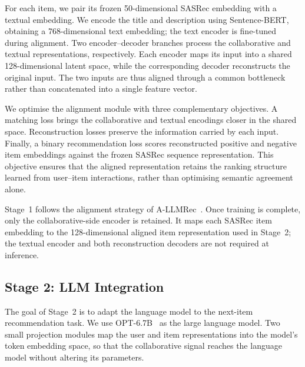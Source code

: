 \documentclass[runningheads]{llncs}
\begin{document}
For each item, we pair its frozen 50-dimensional SASRec embedding with a
textual embedding. We encode the title and description using Sentence-BERT,
obtaining a 768-dimensional text embedding; the text encoder is fine-tuned
during alignment. Two encoder--decoder branches process the collaborative and
textual representations, respectively. Each
encoder maps its input into a shared 128-dimensional latent space, while the
corresponding decoder reconstructs the original input. The two inputs are thus
aligned through a common bottleneck rather than concatenated into a single
feature vector.

We optimise the alignment module with three complementary objectives. A
matching loss brings the collaborative and textual encodings closer in the
shared space. Reconstruction losses preserve the information carried by each
input. Finally, a binary
recommendation loss scores reconstructed positive and negative item embeddings
against the frozen SASRec sequence representation. This objective ensures that
the aligned representation retains the ranking structure learned from user--item
interactions, rather than optimising semantic agreement alone.

Stage~1 follows the alignment strategy of A-LLMRec~\cite{kim2024large}. Once
training is complete, only the collaborative-side encoder is retained. It maps
each SASRec item embedding to the 128-dimensional aligned item representation
used in Stage~2; the textual encoder and both reconstruction decoders are not
required at inference.


\subsection{Stage 2: LLM Integration}
\label{sec:stage2}

The goal of Stage~2 is to adapt the language model to the next-item recommendation
task. We use OPT-6.7B~\cite{opt} as the large language model. Two small projection
modules map the user and item representations into the model's token embedding space,
so that the collaborative signal reaches the language model without altering its
parameters.

\end{document}
